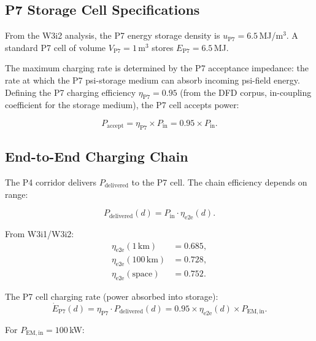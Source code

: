 \documentclass[aps,prd,twocolumn,superscriptaddress]{revtex4-2}
\begin{document}
\subsection{P7 Storage Cell Specifications}

From the W3i2 analysis, the P7 energy storage density is
$u_\mathrm{P7} = 6.5$\,MJ/m$^3$.  A standard P7 cell of volume
$V_\mathrm{P7} = 1$\,m$^3$ stores $E_\mathrm{P7} = 6.5$\,MJ.

The maximum charging rate is determined by the P7 acceptance impedance:
the rate at which the P7 psi-storage medium can absorb incoming
psi-field energy.  Defining the P7 charging efficiency $\eta_\mathrm{P7} = 0.95$
(from the DFD corpus, in-coupling coefficient for the storage medium),
the P7 cell accepts power:

\begin{equation}
P_\mathrm{accept} = \eta_\mathrm{P7}\times P_\mathrm{in} = 0.95\times P_\mathrm{in}.
\label{eq:P_accept}
\end{equation}

\subsection{End-to-End Charging Chain}

The P4 corridor delivers $P_\mathrm{delivered}$ to the P7 cell.
The chain efficiency depends on range:

\begin{equation}
P_\mathrm{delivered}(d) = P_\mathrm{in}\cdot\eta_\mathrm{e2e}(d).
\label{eq:P_delivered}
\end{equation}

From W3i1/W3i2:
\begin{align}
\eta_\mathrm{e2e}(1\,\mathrm{km}) &= 0.685, \nonumber\\
\eta_\mathrm{e2e}(100\,\mathrm{km}) &= 0.728, \nonumber\\
\eta_\mathrm{e2e}(\mathrm{space}) &= 0.752.
\end{align}

The P7 cell charging rate (power absorbed into storage):
\begin{equation}
\dot{E}_\mathrm{P7}(d) = \eta_\mathrm{P7}\cdot P_\mathrm{delivered}(d)
= 0.95\times\eta_\mathrm{e2e}(d)\times P_\mathrm{EM,in}.
\label{eq:E_dot_P7}
\end{equation}

For $P_\mathrm{EM,in} = 100$\,kW:
\end{document}

